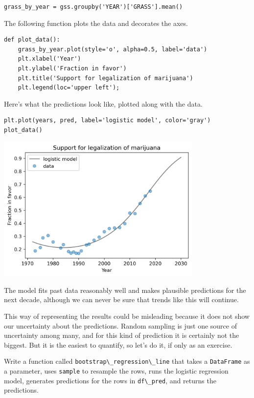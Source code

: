 \begin{lstlisting}[]
grass_by_year = gss.groupby('YEAR')['GRASS'].mean()
\end{lstlisting}

The following function plots the data and decorates the axes.

\begin{lstlisting}[]
def plot_data():
    grass_by_year.plot(style='o', alpha=0.5, label='data')
    plt.xlabel('Year')
    plt.ylabel('Fraction in favor')
    plt.title('Support for legalization of marijuana')
    plt.legend(loc='upper left');
\end{lstlisting}

Here's what the predictions look like, plotted along with the data.

\begin{lstlisting}[]
plt.plot(years, pred, label='logistic model', color='gray')
plot_data()
\end{lstlisting}

\begin{center}
\includegraphics[width=4in]{chapters/12_bootstrap_files/12_bootstrap_144_0.png}
\end{center}

The model fits past data reasonably well and makes plausible predictions
for the next decade, although we can never be sure that trends like this
will continue.

This way of representing the results could be misleading because it does
not show our uncertainty about the predictions. Random sampling is just
one source of uncertainty among many, and for this kind of prediction it
is certainly not the biggest. But it is the easiest to quantify, so
let's do it, if only as an exercise.

Write a function called
\passthrough{\lstinline!bootstrap\_regression\_line!} that takes a
\passthrough{\lstinline!DataFrame!} as a parameter, uses
\passthrough{\lstinline!sample!} to resample the rows, runs the logistic
regression model, generates predictions for the rows in
\passthrough{\lstinline!df\_pred!}, and returns the predictions.

